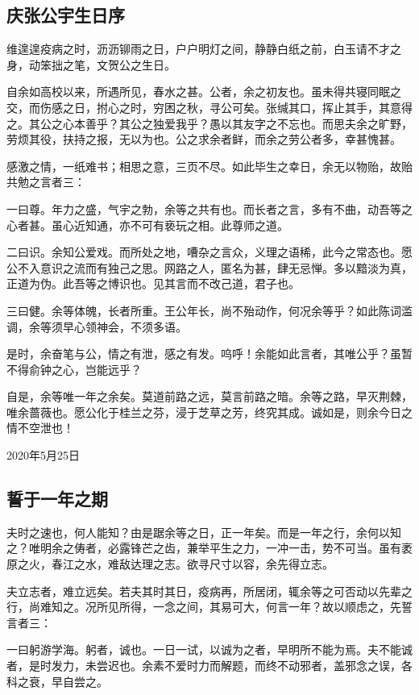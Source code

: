 \documentclass[a5paper]{ctexart}
\begin{document}
	
	\subsection{庆张公宇生日序}
	维遑遑疫病之时，沥沥铆雨之日，户户明灯之间，静静白纸之前，白玉请不才之身，动笨拙之笔，文贺公之生日。
	
	自余如高校以来，所遇所见，春水之甚。公者，余之初友也。虽未得共寝同眠之交，而伤感之日，拊心之时，穷困之秋，寻公可矣。张缄其口，挥止其手，其意得之。其公之心本善乎？其公之独爱我乎？愚以其友字之不忘也。而思夫余之旷野，劳烦其役，扶持之报，无以为也。公之求余者鲜，而余之劳公者多，幸甚愧甚。
	
	感激之情，一纸难书；相思之意，三页不尽。如此毕生之幸日，余无以物贻，故贻共勉之言者三：
	
	一曰尊。年力之盛，气宇之勃，余等之共有也。而长者之言，多有不曲，动吾等之心者甚。虽心近知通，亦不可有亵玩之相。此尊师之道。
	
	二曰识。余知公爱戏。而所处之地，嘈杂之言众，义理之语稀，此今之常态也。愿公不入意识之流而有独己之思。网路之人，匿名为甚，肆无忌惮。多以黯淡为真，正道为伪。此吾等之博识也。见其言而不改己道，君子也。
	
	三曰健。余等体魄，长者所重。王公年长，尚不殆动作，何况余等乎？如此陈词滥调，余等须早心领神会，不须多语。
	
	是时，余奋笔与公，情之有泄，感之有发。呜呼！余能如此言者，其唯公乎？虽暂不得俞钟之心，岂能远乎？
	
	自是，余等唯一年之余矣。莫道前路之远，莫言前路之暗。余等之路，早灭荆棘，唯余蔷薇也。愿公化于桂兰之芬，浸于芝草之芳，终究其成。诚如是，则余今日之情不空泄也！
	\begin{flushright}
		2020年5月25日
	\end{flushright}
	
	\subsection{誓于一年之期}
	夫时之速也，何人能知？由是踞余等之日，正一年矣。而是一年之行，余何以知之？唯明余之俦者，必露锋芒之齿，兼举平生之力，一冲一击，势不可当。虽有袤原之火，春江之水，难敌达理之志。欲寻尺寸以容，余先得立志。
	
	夫立志者，难立远矣。若夫其时其日，疫病再，所居闭，辄余等之可否动以先辈之行，尚难知之。况所见所得，一念之间，其易可大，何言一年？故以顺虑之，先誓言者三：
	
	一曰躬游学海。躬者，诚也。一日一试，以诚为之者，早明所不能为焉。夫不能诚者，是时发力，未尝迟也。余素不爱时力而解题，而终不动邪者，盖邪念之误，各科之衰，早自尝之。
	
\end{document}
